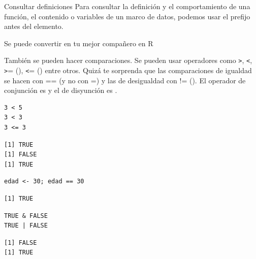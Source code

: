 \documentclass[8pt]{beamer}
\begin{document}
\begin{frame}[fragile]{Consultar definiciones}
	Para consultar la definición y el comportamiento de una función, el contenido o variables de un marco de datos, podemos usar el prefijo  antes del elemento.
 
	
	Se puede convertir en tu mejor compañero en R \asky
\end{frame}








\begin{frame}[fragile]
	También se pueden hacer comparaciones. Se pueden usar operadores como \texttt{>}, \texttt{<}, \texttt{>}= (\rscript{>=}), \texttt{<}= (\rscript{<=}) entre otros. Quizá te sorprenda que las comparaciones de igualdad se hacen con == (y no con =) y las de desigualdad con != (\rscript{!=}). El operador de conjunci\'on es \rscript{&} y el de disyunci\'on es  \rscript{|}. 
	
\begin{lstlisting}[style=RScript]
3 < 5
3 < 3
3 <= 3
\end{lstlisting}
\begin{lstlisting}[style=RConsole]
[1] TRUE
[1] FALSE
[1] TRUE
\end{lstlisting}
\begin{lstlisting}[style=RScript]
edad <- 30; edad == 30
\end{lstlisting}
\begin{lstlisting}[style=RConsole]
[1] TRUE
\end{lstlisting}

\begin{lstlisting}[style=RScript]
TRUE & FALSE	
TRUE | FALSE
\end{lstlisting}
\begin{lstlisting}[style=RConsole]
[1] FALSE
[1] TRUE
\end{lstlisting}
\end{frame}
\end{document}
